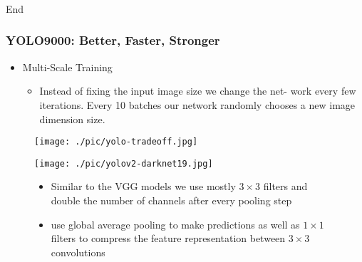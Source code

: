 \documentclass{beamer}
\begin{document}
\begin{frame}
  \frametitle{}
End
\end{frame}


\begin{frame}
  \frametitle{YOLO9000: Better, Faster, Stronger}
  \begin{itemize}
  \item Multi-Scale Training
    \begin{itemize}
    \item Instead of fixing the input image size we change the net- work every few
      iterations. Every 10 batches our network randomly chooses a new image
      dimension size.
    \end{itemize}
  \end{itemize}
  \begin{figure}[!htb]
    \centering
    \texttt{[image: ./pic/yolo-tradeoff.jpg]}
  \end{figure}
\end{frame}

\begin{frame}

  \begin{figure}[ht]
    \centering
    \begin{minipage}{.6\textwidth}
      \centering
      \texttt{[image: ./pic/yolov2-darknet19.jpg]}
    \end{minipage}%
    \begin{minipage}{.4\textwidth}
      \begin{itemize}
      \item Similar to the VGG models we use mostly $3\times3$ filters and
        double the number of channels after every pooling step
      \item use global average pooling to make predictions as well as $1\times1$
        filters to compress the feature representation between $3\times3$
        convolutions
      \end{itemize}
    \end{minipage}
  \end{figure}


\end{frame}
\end{document}
